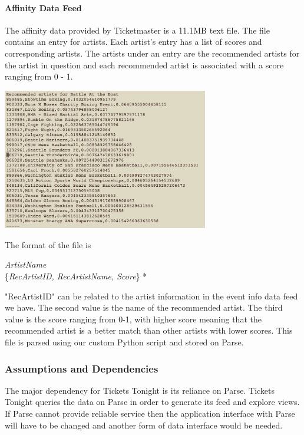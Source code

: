 		       	\paragraph{Affinity Data Feed}
		       	The affinity data provided by Ticketmaster is a 11.1MB text file. The file contains an entry for 
		       	artists. Each artist’s entry has a list of scores and corresponding artists. The artists under an entry 
		       	are the recommended artists for the artist in question and each recommended artist is associated 
		       	with a score ranging from 0 - 1.
		       	\begin{center}
		       		\includegraphics[width=90mm]{./pics/txt1.png}
		       	\end{center}
		       	The format of the file is
		       	\begin{center}
		       	\textit{ArtistName} \\
		       	\{\textit{RecArtistID, RecArtistName, Score}\} *
		       	 \end{center}
		       	 "RecArtistID" can be related to the artist information in the event info data feed we have. The 
		       	 second value is the name of the recommended artist. The third value is the score ranging from 
		       	 0-1, with higher score meaning that the recommended artist is a better match than other artists 
		       	 with lower scores. This file is parsed using our custom Python script and stored on Parse.
		    \subsubsection{ Assumptions and Dependencies}
		     The major dependency for Tickets Tonight is its reliance on Parse. Tickets Tonight queries the data 
		     on Parse in order to generate its feed and explore views. If Parse cannot provide reliable service then 
		     the application interface with Parse will have to be changed and another form of data interface would 
		     be needed. 
	   